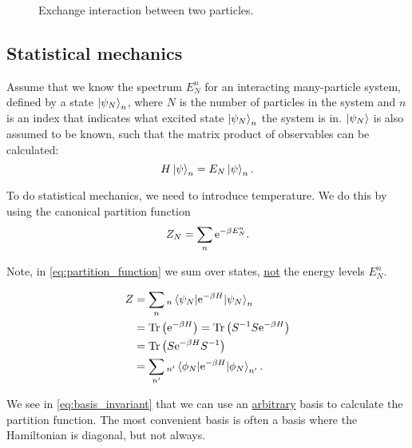 \begin{figure}
\centering

\caption{Exchange interaction between two particles.}
\end{figure}


\subsection{Statistical mechanics}

Assume that we know the spectrum $E_N^n$ for an interacting many-particle system, defined by a state $\ket{\psi_N}_n$, where $N$ is the number of particles in the system and $n$ is an index that indicates what excited state $\ket{\psi_N}_n$ the system is in. 
$\ket{\psi_N}$ is also assumed to be known, such that the matrix product of observables can be calculated: 
\begin{equation}
H\ket{\psi}_n = E_N\ket{\psi}_n.
\end{equation}

To do statistical mechanics, we need to introduce temperature. We do this by using the canonical partition function
\begin{equation}
\label{eq:partition_function}
Z_N = \sum_n\mathrm{e}^{-\beta E_N^n}.
\end{equation}

Note, in \eqref{eq:partition_function} we sum over states, \underline{not} the energy levels $E_N^n$.

\begin{align}
Z &= \sum_n {}_n\mel{\psi_N}{\mathrm{e}^{-\beta H}}{\psi_N}_n \nonumber \\
 &= \Tr\left(\mathrm{e}^{-\beta H}\right) = \Tr\left(S^{-1}S\mathrm{e}^{-\beta H}\right) \nonumber\\
 &= \Tr\left(S\mathrm{e}^{-\beta H}S^{-1}\right) \nonumber \\
 &= \sum_{n'}{}_{n'}\mel{\phi_N}{\mathrm{e}^{-\beta H}}{\phi_N}_{n'}. \label{eq:basis_invariant}
\end{align}

We see in \eqref{eq:basis_invariant} that we can use an \underline{arbitrary} basis to calculate the partition function. The most convenient basis is often a basis where the Hamiltonian is diagonal, but not always.

